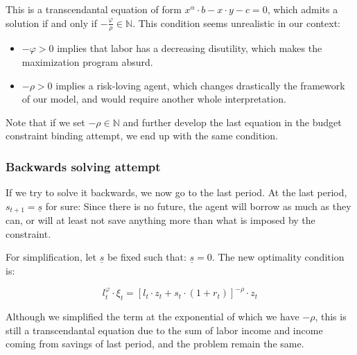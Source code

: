 \documentclass{article}
\begin{document}
This is a transcendantal equation of form 
$x^{\alpha}\cdot b - x\cdot y - c = 0$,
which admits a solution if and only if $-\frac{\varphi}{\rho} \in \mathbb{N}$.
This condition seems unrealistic in our context: 

\begin{itemize}
    \item $-\varphi >0$ implies that labor has a decreasing disutility,
    which makes the maximization program absurd.
    \item $-\rho >0$ implies a risk-loving agent, which changes 
    drastically the framework of our model, and would require another whole 
    interpretation.
\end{itemize}

Note that if we set $-\rho\in\mathbb{N}$ and further develop the last equation in the 
budget constraint binding attempt, we end up with the same condition.

\subsubsection{Backwards solving attempt}

If we try to solve it backwards, we now go to the last period. 
At the last period, $s_{t+1} = \underline{s}$ for sure:
Since there is no future, 
the agent will borrow as much as they can,
or will at least not save anything more than what is imposed 
by the constraint. 

For simplification, let $\underline{s}$ be fixed such that: $\underline{s} = 0$.
The new optimality condition is: 

\begin{equation}
    l_{t}^{\varphi}\cdot \xi_{t} = \left[l_{t}\cdot z_{t} + s_{t}\cdot(1+r_{t})\right]^{-\rho}\cdot z_{t}
\end{equation}

Although we simplified the term at the exponential of which 
we have $-\rho$, this is still a transcendantal equation due to the sum 
of labor income and income coming from savings of last period, 
and the problem remain the same.
\end{document}
